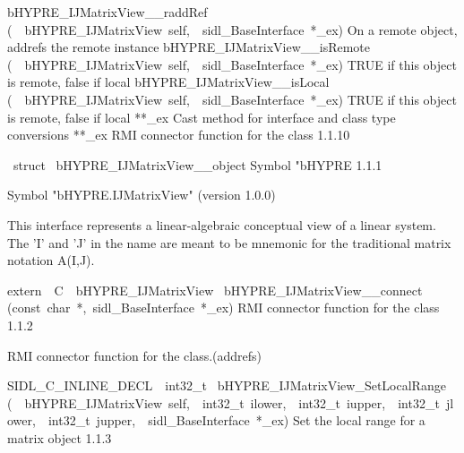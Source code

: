 \documentclass{article}
\begin{document}
\begin{cxxentry}
\begin{cxxentry}
\begin{cxxnames}
        {bHYPRE\_IJMatrixView\_\_raddRef}
        {(\ \ bHYPRE\_IJMatrixView\ self,\ \ sidl\_BaseInterface\ *\_ex)}
        {
On a remote object, addrefs the remote instance}
        {}
\label{cxx.1.1.17}
        {bHYPRE\_IJMatrixView\_\_isRemote}
        {(\ \ bHYPRE\_IJMatrixView\ self,\ \ sidl\_BaseInterface\ *\_ex)}
        {
TRUE if this object is remote, false if local}
        {}
\label{cxx.1.1.18}
        {bHYPRE\_IJMatrixView\_\_isLocal}
        {(\ \ bHYPRE\_IJMatrixView\ self,\ \ sidl\_BaseInterface\ *\_ex)}
        {
TRUE if this object is remote, false if local}
        {}
\label{cxx.1.1.19}
        {**\_ex}
        {}
        {
Cast method for interface and class type conversions}
        {}
\label{cxx.1.1.20}
        {**\_ex}
        {}
        {
RMI connector function for the class}
        {1.1.10}
\end{cxxnames}
\begin{cxxvariable}
{\ struct\ }
        {bHYPRE\_IJMatrixView\_\_object}
        {}
        {
Symbol "bHYPRE}
        {1.1.1}
\begin{cxxdoc}

Symbol "bHYPRE.IJMatrixView" (version 1.0.0)

This interface represents a linear-algebraic conceptual view of a
linear system.  The 'I' and 'J' in the name are meant to be
mnemonic for the traditional matrix notation A(I,J).
\end{cxxdoc}
\end{cxxvariable}
\begin{cxxfunction}
{extern\ \ C\ \ bHYPRE\_IJMatrixView\ }
        {bHYPRE\_IJMatrixView\_\_connect}
        {(const\ char\ *,\ sidl\_BaseInterface\ *\_ex)}
        {
RMI connector function for the class}
        {1.1.2}
\begin{cxxdoc}

RMI connector function for the class.(addrefs)
\end{cxxdoc}
\end{cxxfunction}
\begin{cxxfunction}
{SIDL\_C\_INLINE\_DECL\ \ int32\_t\ }
        {bHYPRE\_IJMatrixView\_SetLocalRange}
        {(\ \ bHYPRE\_IJMatrixView\ self,\ \ int32\_t\ ilower,\ \ int32\_t\ iupper,\ \ int32\_t\ jlower,\ \ int32\_t\ jupper,\ \ sidl\_BaseInterface\ *\_ex)}
        {
Set the local range for a matrix object}
        {1.1.3}
\begin{cxxdoc}


\end{cxxdoc}
\end{cxxfunction}
\end{cxxentry}
\end{cxxentry}
\end{document}
